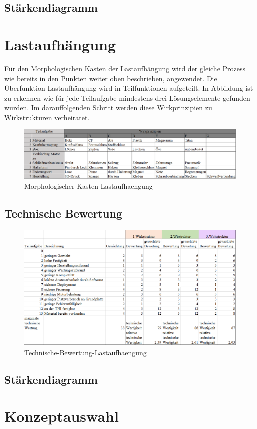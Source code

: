 \subsection{Stärkendiagramm}



\section{Lastaufhängung}
Für den Morphologischen Kasten der Lastaufhängung wird der gleiche Prozess wie bereits in den Punkten weiter oben beschrieben, angewendet.
Die Überfunktion Lastaufhängung wird in Teilfunktionen aufgeteilt. In Abbildung ist zu erkennen wie für jede Teilaufgabe mindestens drei Lösungselemente gefunden wurden. Im darauffolgenden Schritt werden diese Wirkprinzipien zu Wirkstrukturen verheiratet.
\begin{figure}[h!]
	\centering
	\includegraphics[width= 1.00\textwidth]{bilder/Morphologischer_Kasten/MorphKastLastaufh}
	\caption{Morphologischer-Kasten-Lastaufhaengung}
\end{figure}

\subsection{Technische Bewertung}

\begin{figure}[h!]
	\centering
	\includegraphics[width= 1.00\textwidth]{bilder/Morphologischer_Kasten/BewLastaufh}
	\caption{Technische-Bewertung-Lastaufhaengung}
\end{figure}

\subsection{Stärkendiagramm}


\section{Konzeptauswahl}